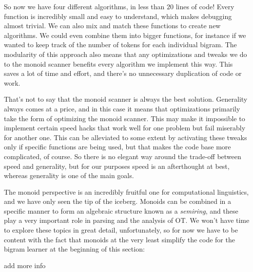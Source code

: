 So now we have four different algorithms, in less than $20$ lines of code!
Every function is incredibly small and easy to understand, which makes debugging almost trivial.
We can also mix and match these functions to create new algorithms.
We could even combine them into bigger functions, for instance if we wanted to keep track of the number of tokens for each individual bigram.
The modularity of this approach also means that any optimizations and tweaks we do to the monoid scanner benefits every algorithm we implement this way.
This saves a lot of time and effort, and there's no unnecessary duplication of code or work.

That's not to say that the monoid scanner is always the best solution.
Generality always comes at a price, and in this case it means that optimizations primarily take the form of optimizing the monoid scanner.
This may make it impossible to implement certain speed hacks that work well for one problem but fail miserably for another one.
This can be alleviated to some extent by activating these tweaks only if specific functions are being used, but that makes the code base more complicated, of course.
So there is no elegant way around the trade-off between speed and generality, but for our purposes speed is an afterthought at best, whereas generality is one of the main goals.

The monoid perspective is an incredibly fruitful one for computational linguistics, and we have only seen the tip of the iceberg.
Monoids can be combined in a specific manner to form an algebraic structure known as a \emph{semiring}, and these play a very important role in parsing and the analysis of OT\@.
We won't have time to explore these topics in great detail, unfortunately, so for now we have to be content with the fact that monoids at the very least simplify the code for the bigram learner at the beginning of this section:
%
\begin{center}
\end{center}

\begin{literature}
add more info
\end{literature}

